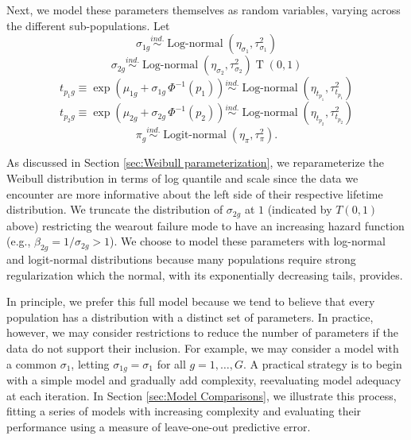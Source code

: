 \documentclass[aoas]{imsart}
\newcommand{\ind}{\stackrel{ind.}{\sim}}
\newcommand{\op}{\operatorname}
\begin{document}
Next, we model these parameters themselves as random variables, varying across the different sub-populations.  Let
\begin{equation*}
\sigma_{1g} \ind \op{Log-normal} \left( \eta_{\sigma_1}, \tau^2_{\sigma_1} \right)
\end{equation*}
\begin{equation*}
\sigma_{2g} \ind \op{Log-normal} \left( \eta_{\sigma_2}, \tau^2_{\sigma_2}\right)\op{T}\left(0, 1\right)
\end{equation*}
\begin{equation}
\label{eq:hier-model}
t_{p_{1}g} \equiv \exp\left(\mu_{1g} + \sigma_{1g}\,\Phi^{-1}(p_1)\right)  \ind \op{Log-normal} \left(\eta_{t_{p_1}}, \tau^2_{t_{p_1}}\right)
\end{equation}
\begin{equation*}
t_{p_{2}g} \equiv \exp\left(\mu_{2g} + \sigma_{2g}\,\Phi^{-1}(p_2)\right)  \ind \op{Log-normal} \left(\eta_{t_{p_2}}, \tau^2_{t_{p_2}}\right)
\end{equation*}
\begin{equation*}
\pi_g \ind \op{Logit-normal}(\eta_\pi, \tau^2_\pi).
\end{equation*}

As discussed in Section \ref{sec:Weibull parameterization}, we reparameterize the Weibull distribution in terms of log quantile and scale since the data we encounter are more informative about the left side of their respective lifetime distribution. We truncate the distribution of $\sigma_{2g}$ at $1$ (indicated by $T(0,1)$ above) restricting the wearout failure mode to have an increasing hazard function (e.g., $\beta_{2g} = 1/\sigma_{2g}>1$). We choose to model these parameters with log-normal and logit-normal distributions because many populations require strong regularization which the normal, with its exponentially decreasing tails, provides. 

In principle, we prefer this full model because we tend to believe that every population has a distribution with a distinct set of parameters. In practice, however, we may consider restrictions to reduce the number of parameters if the data do not support their inclusion. For example, we may consider a model with a common $\sigma_{1}$, letting $\sigma_{1g}=\sigma_1$ for all $g=1,\ldots,G$. A practical strategy is to begin with a simple model and gradually add complexity, reevaluating model adequacy at each iteration. In Section \ref{sec:Model Comparisons}, we illustrate this process, fitting a series of models with increasing complexity and evaluating their performance using a measure of leave-one-out predictive error.
\end{document}
